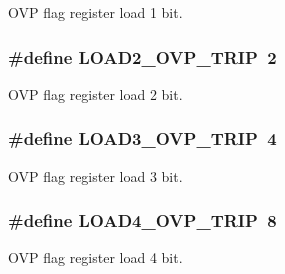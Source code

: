 O\-V\-P flag register load 1 bit. \hypertarget{a00036_a06deb869d76201f8fa804f155a6d0204}{
\subsubsection[{L\-O\-A\-D2\-\_\-\-O\-V\-P\-\_\-\-T\-R\-I\-P}]{\setlength{\rightskip}{0pt plus 5cm}\#define L\-O\-A\-D2\-\_\-\-O\-V\-P\-\_\-\-T\-R\-I\-P~2}}\label{a00036_a06deb869d76201f8fa804f155a6d0204}
O\-V\-P flag register load 2 bit. \hypertarget{a00036_a48d28ba735dc28df3ba0c96ca99c3ba0}{
\subsubsection[{L\-O\-A\-D3\-\_\-\-O\-V\-P\-\_\-\-T\-R\-I\-P}]{\setlength{\rightskip}{0pt plus 5cm}\#define L\-O\-A\-D3\-\_\-\-O\-V\-P\-\_\-\-T\-R\-I\-P~4}}\label{a00036_a48d28ba735dc28df3ba0c96ca99c3ba0}
O\-V\-P flag register load 3 bit. \hypertarget{a00036_a77c2bd0f4f1081fadf180ae92c5b0b79}{
\subsubsection[{L\-O\-A\-D4\-\_\-\-O\-V\-P\-\_\-\-T\-R\-I\-P}]{\setlength{\rightskip}{0pt plus 5cm}\#define L\-O\-A\-D4\-\_\-\-O\-V\-P\-\_\-\-T\-R\-I\-P~8}}\label{a00036_a77c2bd0f4f1081fadf180ae92c5b0b79}
O\-V\-P flag register load 4 bit. 

